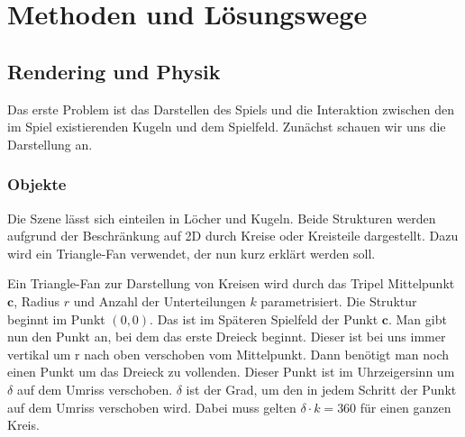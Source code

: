 \chapter{Methoden und Lösungswege}
\section{Rendering und Physik}
	Das erste Problem ist das Darstellen des Spiels und die Interaktion zwischen den im Spiel existierenden Kugeln und dem Spielfeld. Zunächst schauen wir uns die Darstellung an.
\subsection{Objekte}
	Die Szene lässt sich einteilen in Löcher und Kugeln. Beide Strukturen werden aufgrund der Beschränkung auf 2D durch Kreise oder Kreisteile dargestellt. Dazu wird ein Triangle-Fan verwendet, der nun kurz erklärt werden soll.
	
	Ein Triangle-Fan zur Darstellung von Kreisen wird durch das Tripel Mittelpunkt $\mathbf{c}$, Radius $r$ und Anzahl der Unterteilungen $k$ parametrisiert. 
	Die Struktur beginnt im Punkt $(0,0)$.
	Das ist im Späteren Spielfeld der Punkt $\mathbf{c}$.
	Man gibt nun den Punkt an, bei dem das erste Dreieck beginnt. Dieser ist bei uns immer vertikal um r nach oben verschoben vom Mittelpunkt. Dann benötigt man noch einen Punkt um das Dreieck zu vollenden. Dieser Punkt ist im Uhrzeigersinn um $\delta$ auf dem Umriss verschoben. 
	$\delta$ ist der Grad, um den in jedem Schritt der Punkt auf dem Umriss verschoben wird. 
	Dabei muss gelten $\delta \cdot k = 360$ für einen ganzen Kreis.

